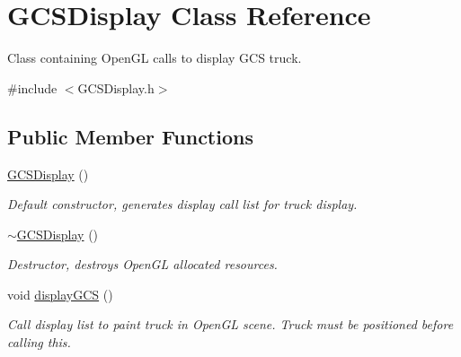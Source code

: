 \hypertarget{class_g_c_s_display}{
\section{GCSDisplay Class Reference}
\label{class_g_c_s_display}
}


Class containing OpenGL calls to display GCS truck.  




{\ttfamily \#include $<$GCSDisplay.h$>$}

\subsection*{Public Member Functions}
\begin{DoxyCompactItemize}
\item 
\hypertarget{class_g_c_s_display_ad816f1052bf3b3a24f830f560e3ec9c6}{
\hyperlink{class_g_c_s_display_ad816f1052bf3b3a24f830f560e3ec9c6}{GCSDisplay} ()}
\label{class_g_c_s_display_ad816f1052bf3b3a24f830f560e3ec9c6}

\begin{DoxyCompactList}\small\item\em Default constructor, generates display call list for truck display. \end{DoxyCompactList}\item 
\hypertarget{class_g_c_s_display_aad39b4a2f467d190c3a9dfb8c886c201}{
\hyperlink{class_g_c_s_display_aad39b4a2f467d190c3a9dfb8c886c201}{$\sim$GCSDisplay} ()}
\label{class_g_c_s_display_aad39b4a2f467d190c3a9dfb8c886c201}

\begin{DoxyCompactList}\small\item\em Destructor, destroys OpenGL allocated resources. \end{DoxyCompactList}\item 
void \hyperlink{class_g_c_s_display_a0cb97de205ce8a90de78be22f19cfec1}{displayGCS} ()
\begin{DoxyCompactList}\small\item\em Call display list to paint truck in OpenGL scene. Truck must be positioned before calling this. \end{DoxyCompactList}\end{DoxyCompactItemize}
